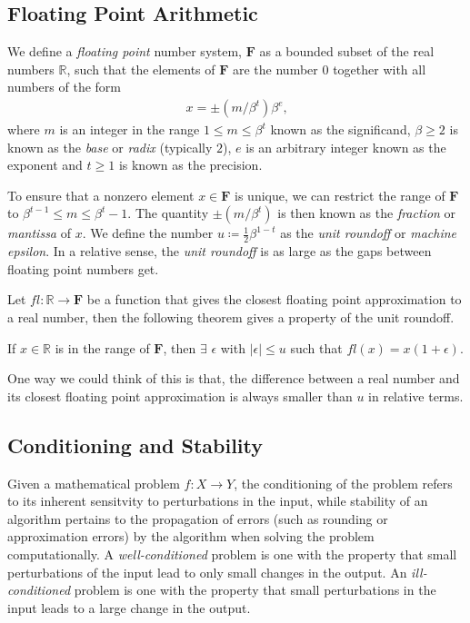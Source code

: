\subsection{Floating Point Arithmetic}\label{sec:FloatingPointArith}

We define a \textit{floating point} number system, $\mathbf{F}$ as a bounded subset of the real numbers $\mathbb{R}$, such that the elements of $\mathbf{F}$ are the number $0$ together with all numbers of the form
\begin{align*}
	x = \pm(m / \beta^t)\beta^e\text{{,}}
\end{align*}
where $m$ is an integer in the range $1\leq m\leq \beta^t$ known as the significand, $\beta \geq 2$ is known as the \textit{base} or \textit{radix} (typically $2$), $e$ is an arbitrary integer known as the exponent and $t\geq 1$ is known as the precision.

To ensure that a nonzero element $x \in \mathbf{F}$ is unique, we can restrict the range of $\mathbf{F}$ to $\beta^{t-1} \leq m \leq \beta^t - 1$. The quantity $\pm(m/\beta^t)$ is then known as the \textit{fraction} or \textit{mantissa} of $x$. We define the number $u \coloneq \frac{1}{2}\beta^{1-t}$ as the \textit{unit roundoff} or \textit{machine epsilon}. In a relative sense, the \textit{unit roundoff} is as large as the gaps between floating point numbers get.

Let $fl :  \mathbb{R} \rightarrow \mathbf{F}$ be a function that gives the closest floating point approximation to a real number, then the following theorem gives a property of the unit roundoff.

\begin{theorem}\label{thrm:FloatingPointSysThrm}
	If $x \in \mathbb{R}$ is in the range of $\mathbf{F}$, then $\exists$ $\epsilon$ with $|\epsilon| \le u$ such that $fl(x) = x(1+\epsilon)$.
\end{theorem}

One way we could think of this is that, the difference between a real number and its closest floating point approximation is always smaller than $u$ in relative terms.

\subsection{Conditioning and Stability}\label{sec:ConditioningAndStability}

Given a mathematical problem $f: X \rightarrow Y$, the conditioning of the problem refers to its inherent sensitvity to perturbations in the input, while stability of an algorithm pertains to the propagation of errors (such as rounding or approximation errors) by the algorithm when solving the problem computationally. A \textit{well-conditioned} problem is one with the property that small perturbations of the input lead to only small changes in the output. An \textit{ill-conditioned} problem is one with the property that small perturbations in the input leads to a large change in the output.

